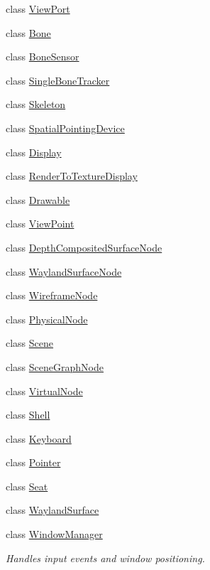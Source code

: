 \begin{DoxyCompactItemize}
class \hyperlink{classmotorcar_1_1ViewPort}{View\-Port}
\item 
class \hyperlink{classmotorcar_1_1Bone}{Bone}
\item 
class \hyperlink{classmotorcar_1_1BoneSensor}{Bone\-Sensor}
\item 
class \hyperlink{classmotorcar_1_1SingleBoneTracker}{Single\-Bone\-Tracker}
\item 
class \hyperlink{classmotorcar_1_1Skeleton}{Skeleton}
\item 
class \hyperlink{classmotorcar_1_1SpatialPointingDevice}{Spatial\-Pointing\-Device}
\item 
class \hyperlink{classmotorcar_1_1Display}{Display}
\item 
class \hyperlink{classmotorcar_1_1RenderToTextureDisplay}{Render\-To\-Texture\-Display}
\item 
class \hyperlink{classmotorcar_1_1Drawable}{Drawable}
\item 
class \hyperlink{classmotorcar_1_1ViewPoint}{View\-Point}
\item 
class \hyperlink{classmotorcar_1_1DepthCompositedSurfaceNode}{Depth\-Composited\-Surface\-Node}
\item 
class \hyperlink{classmotorcar_1_1WaylandSurfaceNode}{Wayland\-Surface\-Node}
\item 
class \hyperlink{classmotorcar_1_1WireframeNode}{Wireframe\-Node}
\item 
class \hyperlink{classmotorcar_1_1PhysicalNode}{Physical\-Node}
\item 
class \hyperlink{classmotorcar_1_1Scene}{Scene}
\item 
class \hyperlink{classmotorcar_1_1SceneGraphNode}{Scene\-Graph\-Node}
\item 
class \hyperlink{classmotorcar_1_1VirtualNode}{Virtual\-Node}
\item 
class \hyperlink{classmotorcar_1_1Shell}{Shell}
\item 
class \hyperlink{classmotorcar_1_1Keyboard}{Keyboard}
\item 
class \hyperlink{classmotorcar_1_1Pointer}{Pointer}
\item 
class \hyperlink{classmotorcar_1_1Seat}{Seat}
\item 
class \hyperlink{classmotorcar_1_1WaylandSurface}{Wayland\-Surface}
\item 
class \hyperlink{classmotorcar_1_1WindowManager}{Window\-Manager}
\begin{DoxyCompactList}\small\item\em Handles input events and window positioning. \end{DoxyCompactList}\end{DoxyCompactItemize}
